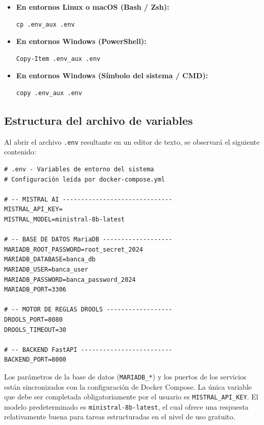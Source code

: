 \begin{itemize}
    \item \textbf{En entornos Linux o macOS (Bash / Zsh):}
\begin{verbatim}
cp .env_aux .env
\end{verbatim}

    \item \textbf{En entornos Windows (PowerShell):}
\begin{verbatim}
Copy-Item .env_aux .env
\end{verbatim}

    \item \textbf{En entornos Windows (Símbolo del sistema / CMD):}
\begin{verbatim}
copy .env_aux .env
\end{verbatim}
\end{itemize}

\subsection{Estructura del archivo de variables}

Al abrir el archivo \texttt{.env} resultante en un editor de texto, se observará el siguiente contenido:

\begin{verbatim}
# .env - Variables de entorno del sistema
# Configuración leída por docker-compose.yml

# -- MISTRAL AI ------------------------------
MISTRAL_API_KEY=
MISTRAL_MODEL=ministral-8b-latest

# -- BASE DE DATOS MariaDB -------------------
MARIADB_ROOT_PASSWORD=root_secret_2024
MARIADB_DATABASE=banca_db
MARIADB_USER=banca_user
MARIADB_PASSWORD=banca_password_2024
MARIADB_PORT=3306

# -- MOTOR DE REGLAS DROOLS ------------------
DROOLS_PORT=8080
DROOLS_TIMEOUT=30

# -- BACKEND FastAPI -------------------------
BACKEND_PORT=8000
\end{verbatim}

Los parámetros de la base de datos (\texttt{MARIADB\_*}) y los puertos de los servicios están sincronizados con la configuración de Docker Compose. La única variable que debe ser completada obligatoriamente por el usuario es \texttt{MISTRAL\_API\_KEY}. El modelo predeterminado es \texttt{ministral-8b-latest}, el cual ofrece una respuesta relativamente buena para tareas estructuradas en el nivel de uso gratuito.

